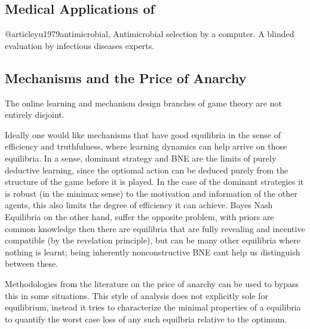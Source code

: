 \subsection{Medical Applications of }


@article{yu1979antimicrobial},
Antimicrobial selection by a computer. A blinded evaluation by infectious diseases experts.


\subsection{Mechanisms and the Price of Anarchy}

The online learning and mechanism design branches of game theory are not entirely disjoint. 

Ideally one would like mechanisms that have good equilibria in the sense of efficiency and truthfulness, where learning dynamics can help arrive on those equilibria. 
In a sense, dominant strategy and BNE are the limits of purely deductive learning, since the optiomal action can be deduced purely from the structure of the game before it is played. 
In the case of the dominant strategies it is robust (in the minimax sense) to the motivation and information of the other agents, this also limits the degree of efficiency it can achieve. 
Bayes Nash Equilibria on the other hand, suffer the opposite problem, with priors are common knowledge then there are equilibria that are fully revealing and incentive compatible (by the revelation principle), but can be many other equilibria where nothing is learnt; being inherently nonconstructive BNE cant help us distinguish between these. 


Methodologies from the literature on  the price of anarchy can be used to bypass this in some situations.
This style of analysis does not explicitly sole for equilibrium, instead it tries to characterize the minimal properties of a equilibria to quantify the worst case loss of any such equilbria relative to the optimum.

